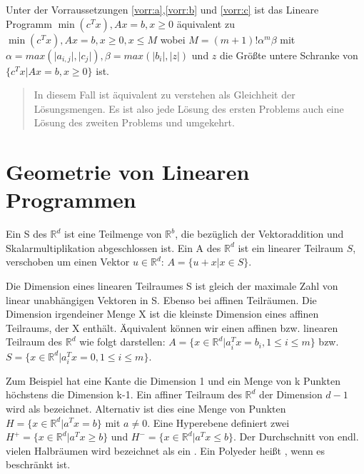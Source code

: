 \begin{theorem}
Unter der Vorraussetzungen \ref{vorr:a},\ref{vorr:b} und \ref{vorr:c} ist das Lineare Programm $\min(c^Tx), Ax=b, x \geq 0$ äquivalent zu $\min(c^Tx), Ax=b, x \geq 0, x\leq M$ wobei %
$M = (m+1)!\alpha^m\beta$ mit $\alpha = max(\lvert a_{i,j}\rvert,\lvert c_{j}\rvert), \beta = max(\lvert b_i\rvert, \lvert z\rvert)$ und $z$ die Größte untere Schranke von $\{c^Tx | Ax=b, x \geq 0\}$ ist. 
\end{theorem}

\begin{quote}
In diesem Fall ist äquivalent zu verstehen als Gleichheit der Lösungsmengen. Es ist also jede Lösung des ersten Problems auch eine Lösung des zweiten Problems und umgekehrt.
\end{quote}

\section{Geometrie von Linearen Programmen}

Ein  S des $\mathbb R^d$ ist eine Teilmenge von $\mathbb R^b$, die
bezüglich der Vektoraddition und Skalarmultiplikation abgeschlossen ist.
Ein  A des $\mathbb R^d$ ist ein linearer Teilraum $S$,
verschoben um einen Vektor $u \in \mathbb R^d$: $A=\{u+x|x \in S\}$.

Die Dimension eines linearen Teilraumes S ist gleich der maximale Zahl von linear unabhängigen
Vektoren in S. Ebenso bei affinen Teilräumen. Die Dimension irgendeiner Menge X ist die kleinste
Dimension eines affinen Teilraums, der X enthält. Äquivalent können wir einen affinen bzw. linearen
Teilraum des $\mathbb R^d$ wie folgt darstellen:
$A = \{ x \in \mathbb R^d | a_i^Tx = b_i , 1 \leq i \leq m \}$
bzw. $S = \{ x \in \mathbb R^d | a_i^Tx = 0 , 1 \leq i \leq m \}$.

Zum Beispiel hat eine Kante die Dimension 1 und ein Menge von k Punkten höchstens die Dimension k-1.
Ein affiner Teilraum des $\mathbb R^d$ der Dimension $d-1$ wird als  bezeichnet.
Alternativ ist dies eine Menge von Punkten $H=\{x \in \mathbb R^d |a^Tx=b\}$ mit $a \neq 0$.
Eine Hyperebene definiert zwei 
$H^{+} = \{x \in \mathbb R^d |a^Tx \geq b\}$ und $H^{-} = \{x \in \mathbb R^d |a^Tx \leq b\}$.
Der Durchschnitt von endl. vielen Halbräumen wird bezeichnet als ein .
Ein Polyeder heißt , wenn es beschränkt ist.

